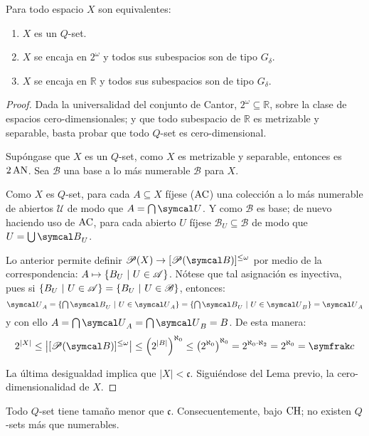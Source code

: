     \begin{proposicion}\label{prop-QsetEquivs}
        Para todo espacio $X$ son equivalentes:
        \begin{enumerate}
            \item $X$ es un $Q$-set.
            \item $X$ se encaja en $2^\omega$ y todos sus subespacios son de tipo $G_\delta$.
            \item $X$ se encaja en $\mathbb{R}$ y todos sus subespacios son de tipo $G_\delta$.
        \end{enumerate}
    \end{proposicion}
    \begin{proof}
        Dada la universalidad del conjunto de Cantor, $2^\omega \subseteq \mathbb{R}$, sobre la clase de espacios cero-dimensionales; y que todo subespacio de $\mathbb{R}$ es metrizable y separable, basta probar que todo $Q$-set es cero-dimensional.

        Supóngase que $X$ es un $Q$-set, como $X$ es metrizable y separable, entonces es $2\operatorname{AN}$. Sea $\mathcal{B}$ una base a lo más numerable $\mathcal{B}$ para $X$.

        Como $X$ es $Q$-set, para cada $A \subseteq X$ fíjese ($\operatorname{AC}$) una colección a lo más numerable de abiertos $\mathcal{U}$ de modo que $A=\midcap \mathcal{U}$. Y como $\mathcal{B}$ es base; de nuevo haciendo uso de $\operatorname{AC}$, para cada abierto $U$ fíjese $\mathcal{B}_U \subseteq \mathcal{B}$ de modo que $U=\midcup \mathcal{B}_U$.

        Lo anterior permite definir $\ms{P}(X) \to [\ms{P}(\mathcal{B})]^{\leq \omega}$ por medio de la correspondencia: $A \mapsto \{B_U \text{ $|$ } U \in \mathscr{A}\}$. Nótese que tal asignación es inyectiva, pues si $\{B_U \text{ $|$ } U \in \mathscr{A}\}=\{B_U \text{ $|$ } U \in \mathscr{B}\}$, entonces:
        \[ \mathcal{U}_A = \{\midcap \mathcal{B}_U \tq U \in \mathcal{U}_A\} = \{\midcap \mathcal{B}_U \tq U \in \mathcal{U}_B\} = \mathcal{U}_A \]
        y con ello $A=\midcap \mathcal{U}_A = \midcap \mathcal{U}_B = B$. De esta manera:
        \[ 2^{|X|} \leq \left| [\ms{P}(\mathcal{B})]^{\leq \omega} \right| \leq \left( 2^{|B|} \right)^{\aleph_0} \leq \left( 2^{\aleph_0} \right) ^{\aleph_0} = 2^{\aleph_0 \cdot \aleph_2} = 2^{\aleph_0} = \mathfrak{c} \]

        La última desigualdad implica que $|X| < \mathfrak{c}$. Siguiéndose del Lema previo, la cero-dimensionalidad de $X$.
    \end{proof}

    \begin{observacion}\label{obs-HCNoQset}
        Todo $Q$-set tiene tamaño menor que $\mathfrak{c}$. Consecuentemente, bajo $\operatorname{CH}$; no existen $Q$-sets más que numerables.
    \end{observacion}

